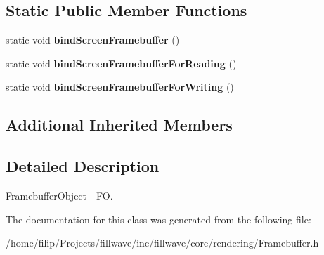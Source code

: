 \subsection*{Static Public Member Functions}
\begin{DoxyCompactItemize}
\item 
static void {\bfseries bind\+Screen\+Framebuffer} ()\hypertarget{classflw_1_1flc_1_1Framebuffer_ab0dab25735dc8694de3c4c05cf0cfedf}{}\label{classflw_1_1flc_1_1Framebuffer_ab0dab25735dc8694de3c4c05cf0cfedf}

\item 
static void {\bfseries bind\+Screen\+Framebuffer\+For\+Reading} ()\hypertarget{classflw_1_1flc_1_1Framebuffer_a4f51156591b3b95480621cf3eb424328}{}\label{classflw_1_1flc_1_1Framebuffer_a4f51156591b3b95480621cf3eb424328}

\item 
static void {\bfseries bind\+Screen\+Framebuffer\+For\+Writing} ()\hypertarget{classflw_1_1flc_1_1Framebuffer_a0e99d4cc1d24e9ae016695ddc524bdd3}{}\label{classflw_1_1flc_1_1Framebuffer_a0e99d4cc1d24e9ae016695ddc524bdd3}

\end{DoxyCompactItemize}
\subsection*{Additional Inherited Members}


\subsection{Detailed Description}
Framebuffer\+Object -\/ FO. 

The documentation for this class was generated from the following file\+:\begin{DoxyCompactItemize}
\item 
/home/filip/\+Projects/fillwave/inc/fillwave/core/rendering/Framebuffer.\+h\end{DoxyCompactItemize}
